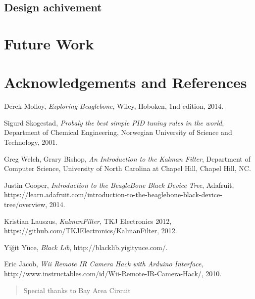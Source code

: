     \subsection{Design achivement}
       

\section{Future Work}




\newpage
\section{Acknowledgements and References}
\begin{thebibliography}{9}

  Derek Molloy,
  \emph{Exploring Beaglebone},
  Wiley, Hoboken,
  1nd edition,
  2014.

  Sigurd Skogestad,
  \emph{Probaly the best simple PID tuning rules in the world},
  Department of Chemical Engineering,
  Norwegian University of Science and Technology,
  2001.

  Greg Welch, Grary Bishop,
  \emph{An Introduction to the Kalman Filter},
  Department of Computer Science,
  University of North Carolina at Chapel Hill,
  Chapel Hill, NC.

  Justin Cooper,
  \emph{Introduction to the BeagleBone Black Device Tree},
  Adafruit,
  https://learn.adafruit.com/introduction-to-the-beaglebone-black-device-tree/overview,
  2014.

  Kristian Lauszus,
  \emph{KalmanFilter},
  TKJ Electronics 2012,
  https://github.com/TKJElectronics/KalmanFilter,
  2012.

  Yiğit Yüce,
  \emph{Black Lib},
  http://blacklib.yigityuce.com/.

  Eric Jacob,
  \emph{Wii Remote IR Camera Hack with Arduino Interface},
  http://www.instructables.com/id/Wii-Remote-IR-Camera-Hack/,
  2010.

\end{thebibliography}

\renewcommand{\abstractname}{Acknowledgements}
\begin{abstract}
Special thanks to Bay Area Circuit
\end{abstract}
\renewcommand{\abstractname}{Abstract}

